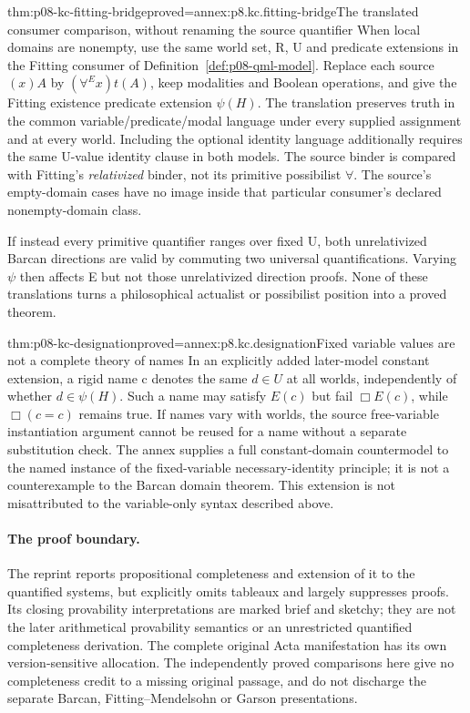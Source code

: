 \begin{hbtheorem}{thm:p08-kc-fitting-bridge}{proved=annex:p8.kc.fitting-bridge}{The translated consumer comparison, without renaming the source quantifier}
When local domains are nonempty, use the same world set, R, U and
predicate extensions in the Fitting consumer of
Definition~\ref{def:p08-qml-model}. Replace each source \((x)A\)
by \((\forall^E x)t(A)\), keep modalities and Boolean operations,
and give the Fitting existence predicate extension \(\psi(H)\).
The translation preserves truth in the common variable/predicate/modal
language under every supplied assignment and at every world. Including
the optional identity language additionally requires the same U-value
identity clause in both models. The source binder is compared with Fitting's
\emph{relativized} binder, not its primitive possibilist \(\forall\).
The source's empty-domain cases have no image inside that particular
consumer's declared nonempty-domain class.

If instead every primitive quantifier ranges over fixed U, both
unrelativized Barcan directions are valid by commuting two universal
quantifications. Varying \(\psi\) then affects E but not those
unrelativized direction proofs. None of these translations turns a
philosophical actualist or possibilist position into a proved theorem.
\end{hbtheorem}

\begin{hbtheorem}{thm:p08-kc-designation}{proved=annex:p8.kc.designation}{Fixed variable values are not a complete theory of names}
In an explicitly added later-model constant extension, a rigid name
c denotes the same \(d\in U\) at all worlds, independently of whether
\(d\in\psi(H)\). Such a name may satisfy \(E(c)\) but fail
\(\Box E(c)\), while \(\Box(c=c)\) remains true.
If names vary with worlds, the source free-variable instantiation
argument cannot be reused for a name without a separate substitution
check. The annex supplies a full constant-domain countermodel to the
named instance of the fixed-variable necessary-identity principle;
it is not a counterexample to the Barcan domain theorem. This extension is not
misattributed to the variable-only syntax described above.
\end{hbtheorem}

\paragraph{The proof boundary.}
The reprint reports propositional completeness and extension of it to
the quantified systems, but explicitly omits tableaux and largely suppresses
proofs. Its closing provability interpretations are marked brief and sketchy;
they are not the later arithmetical provability semantics or an unrestricted
quantified completeness derivation. The complete original Acta manifestation
has its own version-sensitive allocation. The independently proved comparisons
here give no completeness credit to a missing original passage, and do not
discharge the separate Barcan, Fitting--Mendelsohn or Garson presentations.
